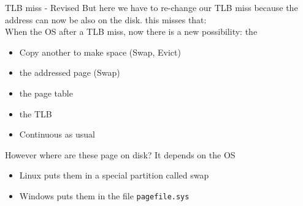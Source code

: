 \begin{parag}{TLB miss - Revised}
    But here we have to re-change our TLB miss because the address can now be also on the disk. this misses that:\\
	When the OS  after a TLB miss, now there is a new possibility: the 
	\begin{itemize}
		\item Copy another  to make space (Swap, Evict)
		\item {} the addressed page (Swap)
		\item {} the page table
		\item {} the TLB
		\item Continuous as usual
	\end{itemize}
	However where are these page on disk? It depends on the OS 
	\begin{itemize}
		\item Linux puts them in a special  partition called swap
		\item Windows puts them in the file \texttt{pagefile.sys}
	\end{itemize}
	
	

\end{parag}

